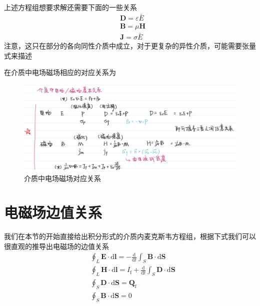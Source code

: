 		上述方程组想要求解还需要下面的一些关系
		\begin{equation}
			\begin{aligned}
			&\boldsymbol{D}=\varepsilon \bar{E} \\
			&\boldsymbol{B}=\mu \boldsymbol{H} \\
			&\boldsymbol{J}=\sigma \bar{E}
			\end{aligned}
		\end{equation}
		注意，这只在部分的各向同性介质中成立，对于更复杂的异性介质，可能需要张量式来描述
		\vspace*{2em}

		在介质中电场磁场相应的对应关系为
		
		\begin{figure}[H]
						\centering  %
						\includegraphics[width=0.9\linewidth]{figs/介质中电场磁场对应关系.jpeg}
						\caption{介质中电场磁场对应关系} %
						\label{fig.介质中电场磁场对应关系}
						\end{figure}
	\section{电磁场边值关系}
		我们在本节的开始直接给出积分形式的介质内麦克斯韦方程组，根据下式我们可以很直观的推导出电磁场的边值关系
			\begin{equation}
				\label{eq.1_53}
				\begin{aligned}
				&\oint_{L} \boldsymbol{E} \cdot \mathrm{d} \boldsymbol{l}=-\frac{\mathrm{d}}{\mathrm{d} t} \int_{S} \boldsymbol{B} \cdot \mathrm{d} \boldsymbol{S} \\
				&\oint_{L} \boldsymbol{H} \cdot \mathrm{d} \boldsymbol{l}=I_{\mathrm{f}}+\frac{\mathrm{d}}{\mathrm{d} t} \int_{S} \boldsymbol{D} \cdot \mathrm{d} \boldsymbol{S} \\
				&\oint_{S} \boldsymbol{D} \cdot \mathrm{d} \boldsymbol{S}=\boldsymbol{Q}_{\mathrm{f}} \\
				&\oint_{S} \boldsymbol{B} \cdot \mathrm{d} \boldsymbol{S}=0
				\end{aligned}
				\end{equation}
